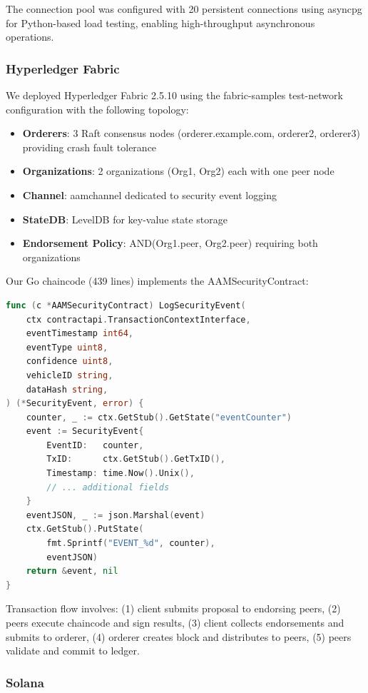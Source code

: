 \documentclass[conference]{IEEEtran}
\begin{document}
The connection pool was configured with 20 persistent connections using asyncpg for Python-based load testing, enabling high-throughput asynchronous operations.

\subsubsection{Hyperledger Fabric}

We deployed Hyperledger Fabric 2.5.10 using the fabric-samples test-network configuration with the following topology:
\begin{itemize}
\item \textbf{Orderers}: 3 Raft consensus nodes (orderer.example.com, orderer2, orderer3) providing crash fault tolerance
\item \textbf{Organizations}: 2 organizations (Org1, Org2) each with one peer node
\item \textbf{Channel}: aamchannel dedicated to security event logging
\item \textbf{StateDB}: LevelDB for key-value state storage
\item \textbf{Endorsement Policy}: AND(Org1.peer, Org2.peer) requiring both organizations
\end{itemize}

Our Go chaincode (439 lines) implements the AAMSecurityContract:

\begin{lstlisting}[language=Go, caption={Hyperledger Chaincode (excerpt)}]
func (c *AAMSecurityContract) LogSecurityEvent(
    ctx contractapi.TransactionContextInterface,
    eventTimestamp int64,
    eventType uint8,
    confidence uint8,
    vehicleID string,
    dataHash string,
) (*SecurityEvent, error) {
    counter, _ := ctx.GetStub().GetState("eventCounter")
    event := SecurityEvent{
        EventID:   counter,
        TxID:      ctx.GetStub().GetTxID(),
        Timestamp: time.Now().Unix(),
        // ... additional fields
    }
    eventJSON, _ := json.Marshal(event)
    ctx.GetStub().PutState(
        fmt.Sprintf("EVENT_%d", counter),
        eventJSON)
    return &event, nil
}
\end{lstlisting}

Transaction flow involves: (1) client submits proposal to endorsing peers, (2) peers execute chaincode and sign results, (3) client collects endorsements and submits to orderer, (4) orderer creates block and distributes to peers, (5) peers validate and commit to ledger.

\subsubsection{Solana}
\end{document}
